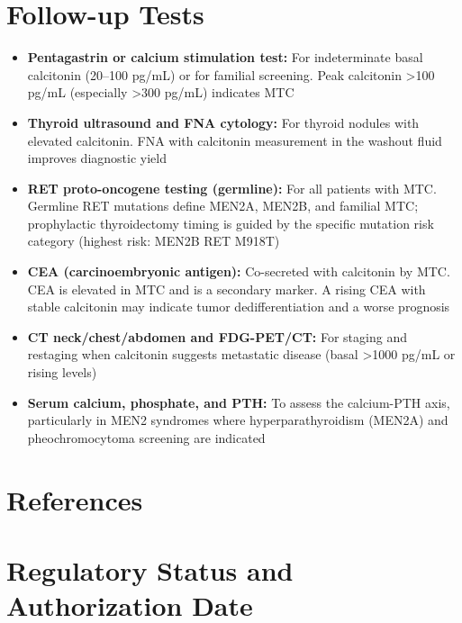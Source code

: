 \section*{Follow-up Tests}
\begin{itemize}
  \item \textbf{Pentagastrin or calcium stimulation test:} For indeterminate basal calcitonin (20--100 pg/mL) or for familial screening. Peak calcitonin >100 pg/mL (especially >300 pg/mL) indicates MTC
  \item \textbf{Thyroid ultrasound and FNA cytology:} For thyroid nodules with elevated calcitonin. FNA with calcitonin measurement in the washout fluid improves diagnostic yield
  \item \textbf{RET proto-oncogene testing (germline):} For all patients with MTC. Germline RET mutations define MEN2A, MEN2B, and familial MTC; prophylactic thyroidectomy timing is guided by the specific mutation risk category (highest risk: MEN2B RET M918T)
  \item \textbf{CEA (carcinoembryonic antigen):} Co-secreted with calcitonin by MTC. CEA is elevated in MTC and is a secondary marker. A rising CEA with stable calcitonin may indicate tumor dedifferentiation and a worse prognosis
  \item \textbf{CT neck/chest/abdomen and FDG-PET/CT:} For staging and restaging when calcitonin suggests metastatic disease (basal >1000 pg/mL or rising levels)
  \item \textbf{Serum calcium, phosphate, and PTH:} To assess the calcium-PTH axis, particularly in MEN2 syndromes where hyperparathyroidism (MEN2A) and pheochromocytoma screening are indicated
\end{itemize}

\section*{References}



\clearpage
\section*{Regulatory Status and Authorization Date}

\clearpage
